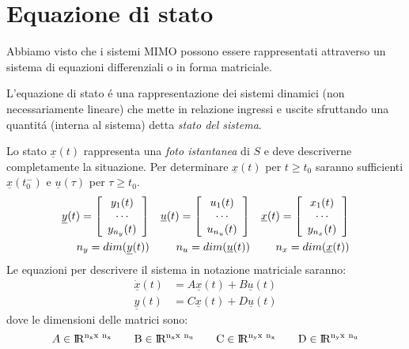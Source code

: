 \documentclass[../main.tex]{subfiles}
\begin{document}
	\section{Equazione di stato}
	Abbiamo visto che i sistemi MIMO possono essere rappresentati attraverso un sistema di equazioni differenziali o in forma matriciale.\\
	\begin{center}
		\begin{minipage}{.9\linewidth}
			L'equazione di stato \'e una rappresentazione dei sistemi dinamici (non necessariamente lineare) che mette in relazione ingressi e uscite sfruttando una quantit\'a (interna al sistema) detta \textit{stato del sistema}.\\
		\end{minipage}
	\end{center}
	Lo stato $ \underline{x}(t) $ rappresenta una \textit{foto istantanea} di $ S $ e deve descriverne completamente la situazione. Per determinare $ \underline{x}(t) $ per $ t \geq t_0 $ saranno sufficienti $ \underline{x}(t^-_0) $ e $ \underline u(\tau) $ per $ \tau \geq t_0 $.\\
	\begin{align*}
		\underline{y}(t) = \left[ \begin{array}{c}y_1(t)\\\cdots\\y_{n_y}(t)\end{array} \right]
		&&\underline{u}(t) = \left[ \begin{array}{c}u_1(t)\\\cdots\\u_{n_u}(t)\end{array} \right]
		&&\underline{x}(t) = \left[ \begin{array}{c}x_1(t)\\\cdots\\y_{n_x}(t)\end{array} \right]\\
		\medskip
		n_y = dim(\underline{y}(t)) &&n_u = dim(\underline{u}(t)) &&n_x = dim(\underline{x}(t))
	\end{align*}
	Le equazioni per descrivere il sistema in notazione matriciale saranno:
	\begin{align*}
		\underline{\dot{x}}(t) &= A \underline{x}(t) + B \underline{u}(t)\\
		\underline{y}(t) &= C \underline{x}(t) + D \underline{u}(t)
	\end{align*}
	dove le dimensioni delle matrici sono:
	\[ A \in \rm I\!R^{n_x x\ n_x} \qquad B \in \rm I\!R^{n_x x\ n_u} \qquad C \in \rm I\!R^{n_y x\ n_x} \qquad D \in \rm I\!R^{n_y x\ n_u} \]
\end{document}

